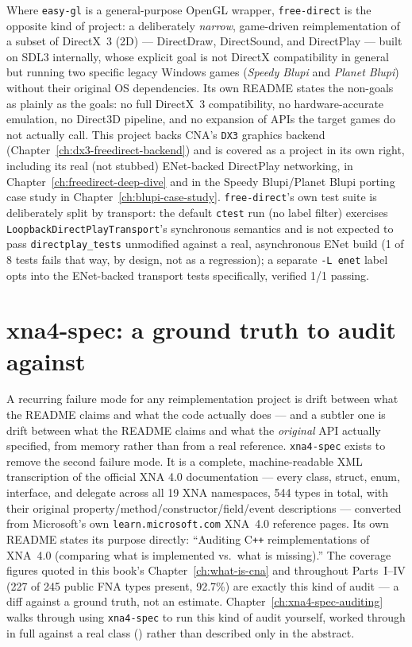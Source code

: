 Where \texttt{easy-gl} is a general-purpose OpenGL wrapper, \texttt{free-direct} is the
opposite kind of project: a deliberately \emph{narrow}, game-driven reimplementation of a
subset of DirectX~3 (2D) --- DirectDraw, DirectSound, and DirectPlay --- built on SDL3
internally, whose explicit goal is not DirectX compatibility in general but running two
specific legacy Windows games (\emph{Speedy Blupi} and \emph{Planet Blupi}) without their
original OS dependencies. Its own README states the non-goals as plainly as the goals: no
full DirectX~3 compatibility, no hardware-accurate emulation, no Direct3D pipeline, and no
expansion of APIs the target games do not actually call. This project backs CNA's
\texttt{DX3} graphics backend (Chapter~\ref{ch:dx3-freedirect-backend}) and is covered as a
project in its own right, including its real (not stubbed) ENet-backed DirectPlay networking,
in Chapter~\ref{ch:freedirect-deep-dive} and in the Speedy Blupi/Planet Blupi porting case study
in Chapter~\ref{ch:blupi-case-study}. \texttt{free-direct}'s own test suite is deliberately split
by transport: the default \texttt{ctest} run (no label filter) exercises
\texttt{LoopbackDirectPlayTransport}'s synchronous semantics and is not expected to pass
\texttt{directplay\_tests} unmodified against a real, asynchronous ENet build (1 of 8 tests fails
that way, by design, not as a regression); a separate \texttt{-L enet} label opts into the
ENet-backed transport tests specifically, verified 1/1 passing.

\section{xna4-spec: a ground truth to audit against}

A recurring failure mode for any reimplementation project is drift between what the README
claims and what the code actually does --- and a subtler one is drift between what the
README claims and what the \emph{original} API actually specified, from memory rather than
from a real reference. \texttt{xna4-spec} exists to remove the second failure mode. It is a
complete, machine-readable XML transcription of the official XNA 4.0 documentation --- every
class, struct, enum, interface, and delegate across all 19 XNA namespaces, 544 types in
total, with their original property/method/constructor/field/event descriptions --- converted
from Microsoft's own \texttt{learn.microsoft.com} XNA~4.0 reference pages. Its own README
states its purpose directly: ``Auditing C\texttt{++} reimplementations of XNA~4.0 (comparing
what is implemented vs.\ what is missing).'' The coverage figures quoted in this book's
Chapter~\ref{ch:what-is-cna} and throughout Parts~I--IV (227 of 245 public FNA types present,
92.7\%) are exactly this kind of audit --- a diff against a ground truth, not an estimate.
Chapter~\ref{ch:xna4-spec-auditing} walks through using \texttt{xna4-spec} to run this kind of
audit yourself, worked through in full against a real class () rather than
described only in the abstract.

